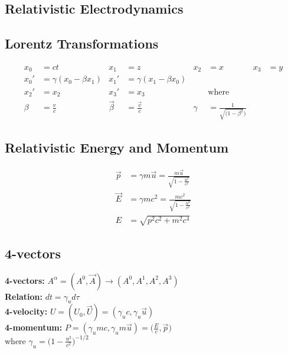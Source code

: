 \documentclass[a4paper, 11pt, landscape]{article}
\begin{document}
\begin{multicols*}{3}
\section{Relativistic Electrodynamics}
\subsection{Lorentz Transformations}
\begin{compactenum}
    \begin{align*}
        x_{0} &= ct & x_{1} &= z & x_{2} &= x & x_{3} &= y \\
        x_{0}' &= \gamma(x_{0} - \beta x_{1}) & x_{1}' &= \gamma(x_{1} - \beta x_{0})\\
        x_{2}' &= x_{2} & x_{3}' &= x_{3} && \text{where}\\
        \beta & = \frac{v}{c} & \vec{\beta} &= \frac{\vec{v}}{c} & \gamma &= \frac{1}{\sqrt{(1 - \beta^{2}})}
    \end{align*}
\end{compactenum}

\subsection{Relativistic Energy and Momentum}
\begin{compactenum}
    \begin{align*}
        \vec{p} &= \gamma m \vec{u} = \frac{m \vec{u}}{\sqrt{1 - \frac{u^{2}}{c^{2}}}} \\ 
        \vec{E} &= \gamma m c^{2} = \frac{mc^{2}}{\sqrt{1 - \frac{u^{2}}{c^{2}}}} \\
        E &= \sqrt{p^{2}c^{2} + m^{2}c^{4}}
    \end{align*}
\end{compactenum}

\subsection{4-vectors}
\begin{compactenum}
    \textbf{4-vectors:} $A^{\alpha} = (A^{0}, \vec{A}) \rightarrow (A^{0}, A^{1}, A^{2}, A^{3})$ \\
    \textbf{Relation:} $dt = \gamma_{u} d\tau$ \\
    \textbf{4-velocity:} $U = (U_{0}, \vec{U}) = (\gamma_{u} c, \gamma_{u} \vec{u})$ \\
    \textbf{4-momentum:} $P = (\gamma_{u} m c, \gamma_{u} m \vec{u}) = \Bigg(\frac{E}{c}, \vec{p} \Bigg)$ \\
    where $\gamma_{u} = \Bigg(1 - \frac{u^{2}}{c^{2}}\Bigg)^{-1/2}$ \\
\end{compactenum}


\end{multicols*}
\end{document}

